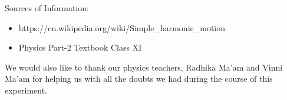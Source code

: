 Sources of Information:
\begin{itemize}
\item https://en.wikipedia.org/wiki/Simple\_harmonic\_motion
  \item Physics Part-2 Textbook Class XI
  \end{itemize}

  We would also like to thank our physics teachers, Radhika Ma'am and Vinni Ma'am for helping us with all the doubts we had during the course of this experiment.
  